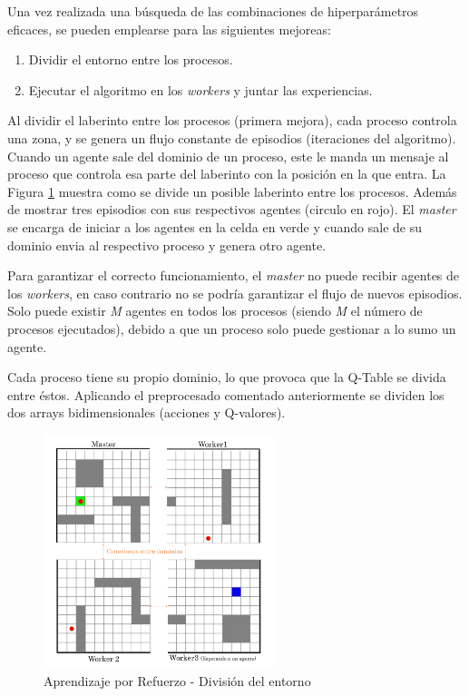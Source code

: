 		

		Una vez realizada una búsqueda de las combinaciones de hiperparámetros eficaces, se pueden emplearse para las siguientes mejoreas:
		
		\begin{enumerate}
			\item Dividir el entorno entre los procesos.
			\item Ejecutar el algoritmo en los \textit{workers} y juntar las experiencias.
		\end{enumerate}

	
		
		Al dividir el laberinto entre los procesos (primera mejora), cada proceso controla una zona, y se genera un flujo constante de episodios (iteraciones del algoritmo). Cuando un agente sale del dominio de un proceso, este le manda un mensaje al proceso que controla esa parte del laberinto con la posición en la que entra. La Figura \ref{fig:rlmpi} muestra como se divide un posible laberinto entre los procesos. Además de mostrar tres episodios con sus respectivos agentes (circulo en rojo). El \textit{master} se encarga de iniciar a los agentes en la celda en verde y cuando sale de su dominio envia al respectivo proceso y genera otro agente. 
		
		Para garantizar el correcto funcionamiento, el \textit{master} no puede recibir agentes de los \textit{workers}, en caso contrario no se podría garantizar el flujo de nuevos episodios. Solo puede existir \textit{M} agentes en todos los procesos (siendo \textit{M} el número de procesos ejecutados), debido a que un proceso solo puede gestionar a lo sumo un agente. 
		
		Cada proceso tiene su propio dominio, lo que provoca que la Q-Table se divida entre éstos. Aplicando el preprocesado comentado anteriormente se dividen los dos arrays bidimensionales (acciones y Q-valores). 
		
		
		
		\begin{figure}[!h]
			\centering
			\includegraphics[width=0.6\textwidth]{images/chapter_3/rl_mpi}	
			\caption{Aprendizaje por Refuerzo - División del entorno}
			\label{fig:rlmpi}
		\end{figure}
	

